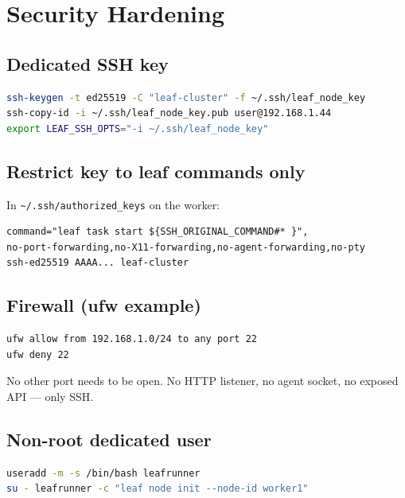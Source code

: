 \documentclass[11pt,a4paper]{article}
\begin{document}
\section{Security Hardening}

\subsection{Dedicated SSH key}

\begin{lstlisting}[language=bash]
ssh-keygen -t ed25519 -C "leaf-cluster" -f ~/.ssh/leaf_node_key
ssh-copy-id -i ~/.ssh/leaf_node_key.pub user@192.168.1.44
export LEAF_SSH_OPTS="-i ~/.ssh/leaf_node_key"
\end{lstlisting}

\subsection{Restrict key to leaf commands only}

In \texttt{\~{}/.ssh/authorized\_keys} on the worker:

\begin{lstlisting}[language={}]
command="leaf task start ${SSH_ORIGINAL_COMMAND#* }",
no-port-forwarding,no-X11-forwarding,no-agent-forwarding,no-pty
ssh-ed25519 AAAA... leaf-cluster
\end{lstlisting}

\subsection{Firewall (ufw example)}

\begin{lstlisting}[language=bash]
ufw allow from 192.168.1.0/24 to any port 22
ufw deny 22
\end{lstlisting}

No other port needs to be open. No HTTP listener, no agent socket, no
exposed API --- only SSH.

\subsection{Non-root dedicated user}

\begin{lstlisting}[language=bash]
useradd -m -s /bin/bash leafrunner
su - leafrunner -c "leaf node init --node-id worker1"
\end{lstlisting}
\end{document}
